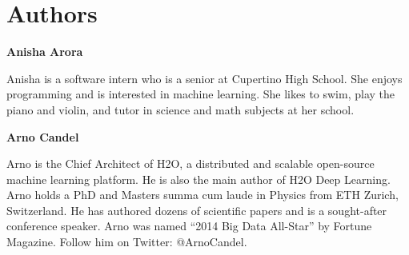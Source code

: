 {{{






















\newpage
\section{Authors}

\textbf{Anisha Arora}

Anisha is a software intern who is a senior at Cupertino High School. She enjoys programming and is interested in machine learning. She likes to swim, play the piano and violin, and tutor in science and math subjects at her school.

\textbf{Arno Candel}

Arno is the Chief Architect of H2O, a distributed and scalable open-source machine learning platform. He is also the main author of H2O Deep Learning.  Arno holds a PhD and Masters summa cum laude in Physics from ETH Zurich, Switzerland. He has authored dozens of scientific papers and is a sought-after conference speaker. Arno was named “2014 Big Data All-Star” by Fortune Magazine. Follow him on Twitter: @ArnoCandel.

}}}
